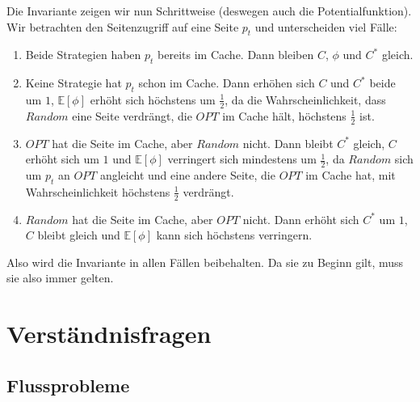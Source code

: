 \documentclass{panikzettel}
\begin{document}
Die Invariante zeigen wir nun Schrittweise (deswegen auch die Potentialfunktion). Wir betrachten den Seitenzugriff auf eine Seite $p_t$ und unterscheiden viel Fälle:
\begin{enumerate}
    \item Beide Strategien haben $p_t$ bereits im Cache. Dann bleiben $C$, $\phi$ und $C^\ast$ gleich.
    \item Keine Strategie hat $p_t$ schon im Cache. Dann erhöhen sich $C$ und $C^\ast$ beide um $1$, $\mathbb{E}[\phi]$ erhöht sich höchstens um $\frac{1}{2}$, da die Wahrscheinlichkeit, dass $Random$ eine Seite verdrängt, die $OPT$ im Cache hält, höchstens $\frac{1}{2}$ ist.
    \item $OPT$ hat die Seite im Cache, aber $Random$ nicht. Dann bleibt $C^\ast$ gleich, $C$ erhöht sich um $1$ und $\mathbb{E}[\phi]$ verringert sich mindestens um $\frac{1}{2}$, da $Random$ sich um $p_t$ an $OPT$ angleicht und eine andere Seite, die $OPT$ im Cache hat, mit Wahrscheinlichkeit höchstens $\frac{1}{2}$ verdrängt.
    \item $Random$ hat die Seite im Cache, aber $OPT$ nicht. Dann erhöht sich $C^\ast$ um $1$, $C$ bleibt gleich und $\mathbb{E}[\phi]$ kann sich höchstens verringern.
\end{enumerate}
Also wird die Invariante in allen Fällen beibehalten. Da sie zu Beginn gilt, muss sie also immer gelten.

\label{ende}
\newpage
\section{Verständnisfragen}

\subsection*{Flussprobleme}
\end{document}
